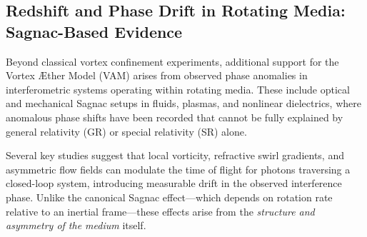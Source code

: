 \documentclass[a4paper, aps,preprint,superscriptaddress, 12pt]{revtex4}
\begin{document}
\subsection{Redshift and Phase Drift in Rotating Media: Sagnac-Based Evidence}

Beyond classical vortex confinement experiments, additional support for the Vortex Æther Model (VAM) arises from observed phase anomalies in interferometric systems operating within rotating media. These include optical and mechanical Sagnac setups in fluids, plasmas, and nonlinear dielectrics, where anomalous phase shifts have been recorded that cannot be fully explained by general relativity (GR) or special relativity (SR) alone.

Several key studies suggest that local vorticity, refractive swirl gradients, and asymmetric flow fields can modulate the time of flight for photons traversing a closed-loop system, introducing measurable drift in the observed interference phase. Unlike the canonical Sagnac effect—which depends on rotation rate relative to an inertial frame—these effects arise from the \emph{structure and asymmetry of the medium} itself.
\end{document}
